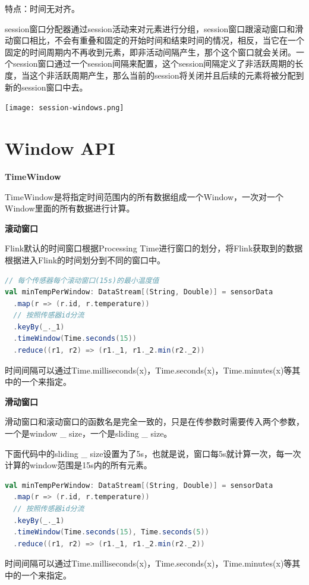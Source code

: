 \documentclass[oneside]{ctexbook}
\begin{document}
特点：时间无对齐。

session窗口分配器通过session活动来对元素进行分组，session窗口跟滚动窗口和滑动窗口相比，不会有重叠和固定的开始时间和结束时间的情况，相反，当它在一个固定的时间周期内不再收到元素，即非活动间隔产生，那个这个窗口就会关闭。一个session窗口通过一个session间隔来配置，这个session间隔定义了非活跃周期的长度，当这个非活跃周期产生，那么当前的session将关闭并且后续的元素将被分配到新的session窗口中去。

\noindent \texttt{[image: session-windows.png]}

\section{Window API}

\textbf{TimeWindow}

TimeWindow是将指定时间范围内的所有数据组成一个Window，一次对一个Window里面的所有数据进行计算。

\textbf{滚动窗口}

Flink默认的时间窗口根据Processing Time进行窗口的划分，将Flink获取到的数据根据进入Flink的时间划分到不同的窗口中。

\begin{lstlisting}[language=scala]
// 每个传感器每个滚动窗口(15s)的最小温度值
val minTempPerWindow: DataStream[(String, Double)] = sensorData
  .map(r => (r.id, r.temperature))
  // 按照传感器id分流
  .keyBy(_._1)
  .timeWindow(Time.seconds(15))
  .reduce((r1, r2) => (r1._1, r1._2.min(r2._2))
\end{lstlisting}

时间间隔可以通过Time.milliseconds(x)，Time.seconds(x)，Time.minutes(x)等其中的一个来指定。

\textbf{滑动窗口}

滑动窗口和滚动窗口的函数名是完全一致的，只是在传参数时需要传入两个参数，一个是window \_ size，一个是sliding \_ size。

下面代码中的sliding \_ size设置为了5s，也就是说，窗口每5s就计算一次，每一次计算的window范围是15s内的所有元素。

\begin{lstlisting}[language=scala]
val minTempPerWindow: DataStream[(String, Double)] = sensorData
  .map(r => (r.id, r.temperature))
  // 按照传感器id分流
  .keyBy(_._1)
  .timeWindow(Time.seconds(15), Time.seconds(5))
  .reduce((r1, r2) => (r1._1, r1._2.min(r2._2))
\end{lstlisting}

时间间隔可以通过Time.milliseconds(x)，Time.seconds(x)，Time.minutes(x)等其中的一个来指定。
\end{document}
